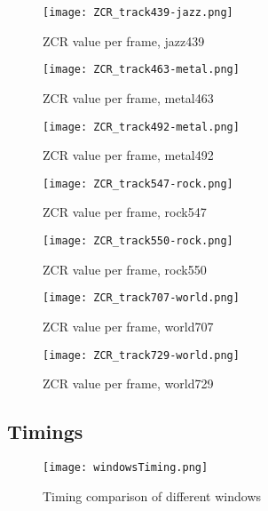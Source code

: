 \documentclass{article} %
\begin{document}
\begin{figure}
\centering
\texttt{[image: ZCR\_track439-jazz.png]}
\caption{ZCR value per frame, jazz439}
\label{fig:ZCR_439}
\end{figure}

\begin{figure}
\centering
\texttt{[image: ZCR\_track463-metal.png]}
\caption{ZCR value per frame, metal463}
\label{fig:ZCR_463}
\end{figure}


\begin{figure}
\centering
\texttt{[image: ZCR\_track492-metal.png]}
\caption{ZCR value per frame, metal492}
\label{fig:ZCR_492}
\end{figure}


\begin{figure}
\centering
\texttt{[image: ZCR\_track547-rock.png]}
\caption{ZCR value per frame, rock547}
\label{fig:ZCR_547}
\end{figure}


\begin{figure}
\centering
\texttt{[image: ZCR\_track550-rock.png]}
\caption{ZCR value per frame, rock550}
\label{fig:ZCR_550}
\end{figure}


\begin{figure}
\centering
\texttt{[image: ZCR\_track707-world.png]}
\caption{ZCR value per frame, world707}
\label{fig:ZCR_707}
\end{figure}


\begin{figure}[h!]
\centering
\texttt{[image: ZCR\_track729-world.png]}
\caption{ZCR value per frame, world729}
\label{fig:ZCR_729}
\end{figure}

\clearpage
\subsection{Timings}

\begin{figure}[ht!]
\centering
\texttt{[image: windowsTiming.png]}
\caption{Timing comparison of different windows}
\label{fig:windowsTimings}
\end{figure}



\end{document}
